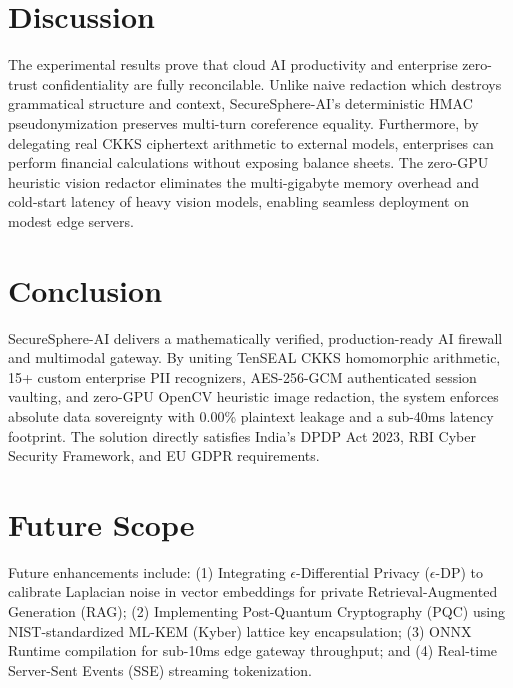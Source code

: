 \documentclass[10pt,a4paper]{article}
\begin{document}
\section{Discussion}
The experimental results prove that cloud AI productivity and enterprise zero-trust confidentiality are fully reconcilable. Unlike naive redaction which destroys grammatical structure and context, SecureSphere-AI's deterministic HMAC pseudonymization preserves multi-turn coreference equality. Furthermore, by delegating real CKKS ciphertext arithmetic to external models, enterprises can perform financial calculations without exposing balance sheets. The zero-GPU heuristic vision redactor eliminates the multi-gigabyte memory overhead and cold-start latency of heavy vision models, enabling seamless deployment on modest edge servers.

\section{Conclusion}
SecureSphere-AI delivers a mathematically verified, production-ready AI firewall and multimodal gateway. By uniting TenSEAL CKKS homomorphic arithmetic, 15+ custom enterprise PII recognizers, AES-256-GCM authenticated session vaulting, and zero-GPU OpenCV heuristic image redaction, the system enforces absolute data sovereignty with 0.00\% plaintext leakage and a sub-40ms latency footprint. The solution directly satisfies India's DPDP Act 2023, RBI Cyber Security Framework, and EU GDPR requirements.

\section{Future Scope}
Future enhancements include: (1) Integrating $\epsilon$-Differential Privacy ($\epsilon$-DP) to calibrate Laplacian noise in vector embeddings for private Retrieval-Augmented Generation (RAG); (2) Implementing Post-Quantum Cryptography (PQC) using NIST-standardized ML-KEM (Kyber) lattice key encapsulation; (3) ONNX Runtime compilation for sub-10ms edge gateway throughput; and (4) Real-time Server-Sent Events (SSE) streaming tokenization.
\end{document}
